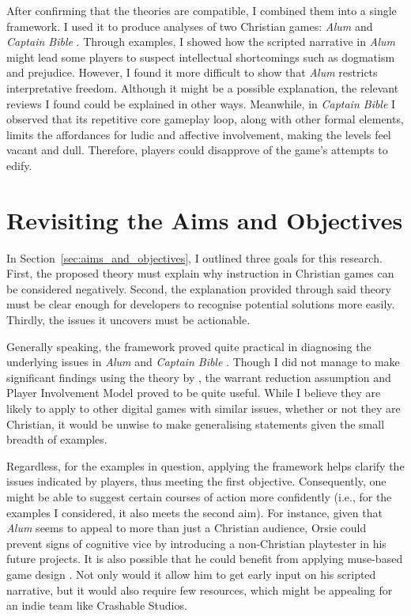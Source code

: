 After confirming that the theories are compatible, I combined them into a single framework. I used it to produce analyses of two Christian games: \textit{Alum} \parencite{orsie_alum_2006} and \textit{Captain Bible} \parencite{engelbrite_captain_1994}. Through examples, I showed how the scripted narrative in \textit{Alum} \parencite{orsie_alum_2006} might lead some players to suspect intellectual shortcomings such as dogmatism and prejudice. However, I found it more difficult to show that \textit{Alum} restricts interpretative freedom. Although it might be a possible explanation, the relevant reviews I found could be explained in other ways. Meanwhile, in \textit{Captain Bible} I observed that its repetitive core gameplay loop, along with other formal elements, limits the affordances for ludic and affective involvement, making the levels feel vacant and dull. Therefore, players could disapprove of the game's attempts to edify. 

\section{Revisiting the Aims and Objectives} \label{sec:revisiting_aims}

In Section~\ref{sec:aims_and_objectives}, I outlined three goals for this research. First, the proposed theory must explain why instruction in Christian games can be considered negatively. Second, the explanation provided through said theory must be clear enough for developers to recognise potential solutions more easily. Thirdly, the issues it uncovers must be actionable.

Generally speaking, the framework proved quite practical in diagnosing the underlying issues in \textit{Alum} \parencite{orsie_alum_2006} and \textit{Captain Bible} \parencite{engelbrite_captain_1994}. Though I did not manage to make significant findings using the theory by \textcite{king_virtue_2017}, the warrant reduction assumption \parencite{repp_whats_2012} and Player Involvement Model \parencite{calleja_in_game_2011} proved to be quite useful. While I believe they are likely to apply to other digital games with similar issues, whether or not they are Christian, it would be unwise to make generalising statements given the small breadth of examples.

Regardless, for the examples in question, applying the framework helps clarify the issues indicated by players, thus meeting the first objective. Consequently, one might be able to suggest certain courses of action more confidently (i.e., for the examples I considered, it also meets the second aim). For instance, given that \textit{Alum} \parencite{orsie_alum_2006} seems to appeal to more than just a Christian audience, Orsie could prevent signs of cognitive vice by introducing a non-Christian playtester in his future projects. It is also possible that he could benefit from applying muse-based game design \parencite{khaled_muse-based_2012}. Not only would it allow him to get early input on his scripted narrative, but it would also require few resources, which might be appealing for an indie team like Crashable Studios.

